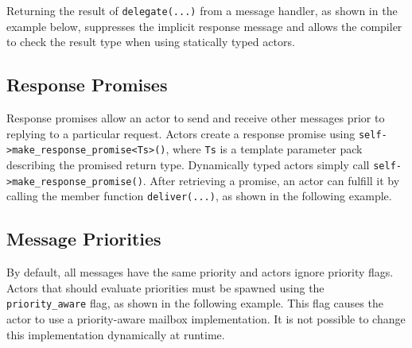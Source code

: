 Returning the result of \lstinline^delegate(...)^ from a message handler, as shown in the example below, suppresses the implicit response message and allows the compiler to check the result type when using statically typed actors.



\subsection{Response Promises}
\label{promise}

Response promises allow an actor to send and receive other messages prior to replying to a particular request. Actors create a response promise using \lstinline^self->make_response_promise<Ts>()^, where \lstinline^Ts^ is a template parameter pack describing the promised return type. Dynamically typed actors simply call \lstinline^self->make_response_promise()^. After retrieving a promise, an actor can fulfill it by calling the member function \lstinline^deliver(...)^, as shown in the following example.



\clearpage
\subsection{Message Priorities}

By default, all messages have the same priority and actors ignore priority flags.
Actors that should evaluate priorities must be spawned using the \lstinline^priority_aware^ flag, as shown in the following example.
This flag causes the actor to use a priority-aware mailbox implementation.
It is not possible to change this implementation dynamically at runtime.


